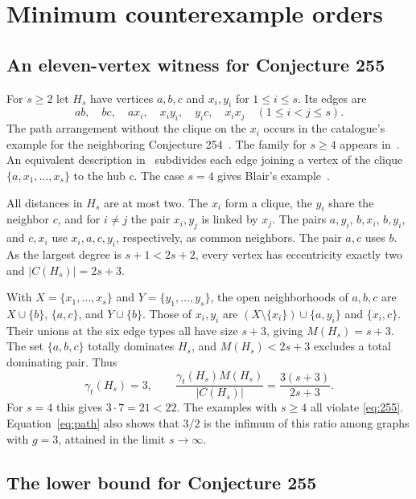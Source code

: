 \documentclass[11pt]{article}
\newcommand{\gt}{\gamma_t}
\begin{document}
\section{Minimum counterexample orders}

\subsection{An eleven-vertex witness for Conjecture 255}

For \(s\ge 2\) let \(H_s\) have vertices \(a,b,c\) and
\(x_i,y_i\) for \(1\le i\le s\). Its edges are
\[
 ab,\quad bc,\quad ax_i,\quad x_i y_i,\quad y_i c,\quad
 x_i x_j \quad(1\le i<j\le s).
\]
The path arrangement without the clique on the \(x_i\) occurs in the
catalogue's example for the neighboring Conjecture 254~\cite{wowii254}.
The family for \(s\ge4\) appears in~\cite{priorfamilies}. An equivalent
description in~\cite{evan255} subdivides each edge joining a vertex of
the clique \(\{a,x_1,\ldots,x_s\}\) to the hub \(c\). The case \(s=4\)
gives Blair's example~\cite{blair255}.

All distances in \(H_s\) are at most two. The \(x_i\) form a clique,
the \(y_i\) share the neighbor \(c\), and for \(i\ne j\) the pair
\(x_i,y_j\) is linked by \(x_j\). The pairs \(a,y_i\), \(b,x_i\),
\(b,y_i\), and \(c,x_i\) use \(x_i,a,c,y_i\), respectively, as
common neighbors. The pair \(a,c\) uses \(b\). As the largest
degree is \(s+1<2s+2\), every vertex has eccentricity exactly
two and \(|C(H_s)|=2s+3\).

With \(X=\{x_1,\ldots,x_s\}\) and \(Y=\{y_1,\ldots,y_s\}\), the
open neighborhoods of \(a,b,c\) are \(X\cup\{b\}\), \(\{a,c\}\),
and \(Y\cup\{b\}\). Those of \(x_i,y_i\) are
\((X\setminus\{x_i\})\cup\{a,y_i\}\) and \(\{x_i,c\}\).
Their unions at the six edge types all have size \(s+3\), giving
\(M(H_s)=s+3\). The set \(\{a,b,c\}\) totally dominates \(H_s\),
and \(M(H_s)<2s+3\) excludes a total dominating pair. Thus
\[
 \gt(H_s)=3,\qquad \frac{\gt(H_s)M(H_s)}{|C(H_s)|}
   =\frac{3(s+3)}{2s+3}.
\]
For \(s=4\) this gives \(3\cdot7=21<22\). The examples with \(s\ge
4\) all violate \eqref{eq:255}. Equation~\eqref{eq:path} also
shows that \(3/2\) is the infimum of this ratio among graphs with
\(g=3\), attained in the limit \(s\to\infty\).

\subsection{The lower bound for Conjecture 255}
\end{document}
